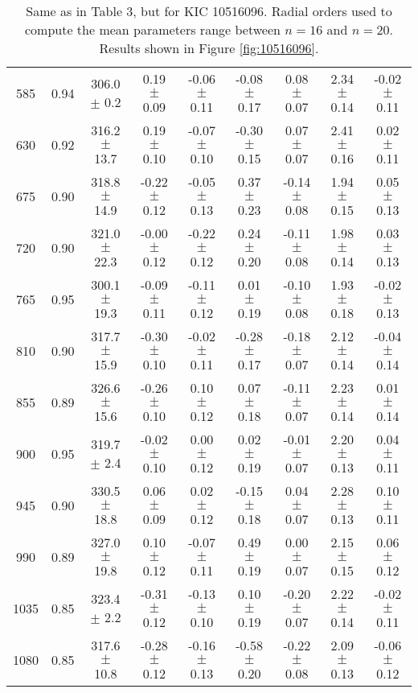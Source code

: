 \documentclass[twocolumn]{aastex61}%
\begin{document}
\begin{table*}[ht]
\begin{tabular}{ccc|ccccc|c}
585 & 0.94 & 306.0 $\pm$ 0.2 & 0.19 $\pm$ 0.09 & -0.06 $\pm$ 0.11 & -0.08 $\pm$ 0.17 & 0.08 $\pm$ 0.07 & 2.34 $\pm$ 0.14 & -0.02 $\pm$ 0.11\\
630 & 0.92 & 316.2 $\pm$ 13.7 & 0.19 $\pm$ 0.10 & -0.07 $\pm$ 0.10 & -0.30 $\pm$ 0.15 & 0.07 $\pm$ 0.07 & 2.41 $\pm$ 0.16 & 0.02 $\pm$ 0.11\\
675 & 0.90 & 318.8 $\pm$ 14.9 & -0.22 $\pm$ 0.12 & -0.05 $\pm$ 0.13 & 0.37 $\pm$ 0.23 & -0.14 $\pm$ 0.08 & 1.94 $\pm$ 0.15 & 0.05 $\pm$ 0.13\\
720 & 0.90 & 321.0 $\pm$ 22.3 & -0.00 $\pm$ 0.12 & -0.22 $\pm$ 0.12 & 0.24 $\pm$ 0.20 & -0.11 $\pm$ 0.08 & 1.98 $\pm$ 0.14 & 0.03 $\pm$ 0.13\\
765 & 0.95 & 300.1 $\pm$ 19.3 & -0.09 $\pm$ 0.11 & -0.11 $\pm$ 0.12 & 0.01 $\pm$ 0.19 & -0.10 $\pm$ 0.08 & 1.93 $\pm$ 0.18 & -0.02 $\pm$ 0.13\\
810 & 0.90 & 317.7 $\pm$ 15.9 & -0.30 $\pm$ 0.10 & -0.02 $\pm$ 0.11 & -0.28 $\pm$ 0.17 & -0.18 $\pm$ 0.07 & 2.12 $\pm$ 0.14 & -0.04 $\pm$ 0.14\\
855 & 0.89 & 326.6 $\pm$ 15.6 & -0.26 $\pm$ 0.10 & 0.10 $\pm$ 0.12 & 0.07 $\pm$ 0.18 & -0.11 $\pm$ 0.07 & 2.23 $\pm$ 0.14 & 0.01 $\pm$ 0.14\\
900 & 0.95 & 319.7 $\pm$ 2.4 & -0.02 $\pm$ 0.10 & 0.00 $\pm$ 0.12 & 0.02 $\pm$ 0.19 & -0.01 $\pm$ 0.07 & 2.20 $\pm$ 0.13 & 0.04 $\pm$ 0.11\\
945 & 0.90 & 330.5 $\pm$ 18.8 & 0.06 $\pm$ 0.09 & 0.02 $\pm$ 0.12 & -0.15 $\pm$ 0.18 & 0.04 $\pm$ 0.07 & 2.28 $\pm$ 0.13 & 0.10 $\pm$ 0.11\\
990 & 0.89 & 327.0 $\pm$ 19.8 & 0.10 $\pm$ 0.12 & -0.07 $\pm$ 0.11 & 0.49 $\pm$ 0.19 & 0.00 $\pm$ 0.07 & 2.15 $\pm$ 0.15 & 0.06 $\pm$ 0.12\\
1035 & 0.85 & 323.4 $\pm$ 2.2 & -0.31 $\pm$ 0.12 & -0.13 $\pm$ 0.10 & 0.10 $\pm$ 0.19 & -0.20 $\pm$ 0.07 & 2.22 $\pm$ 0.14 & -0.02 $\pm$ 0.11\\
1080 & 0.85 & 317.6 $\pm$ 10.8 & -0.28 $\pm$ 0.12 & -0.16 $\pm$ 0.13 & -0.58 $\pm$ 0.20 & -0.22 $\pm$ 0.08 & 2.09 $\pm$ 0.13 & -0.06 $\pm$ 0.12\\
\end{tabular}
\caption{Same as in Table 3, but for KIC 10516096. Radial orders used to compute the mean parameters range between $n=16$ and $n=20$. Results shown in Figure \ref{fig:10516096}.}\label{tab:10516096}\vspace{-1.5cm}
\end{table*}

\FloatBarrier
\nopagebreak
\end{document}
